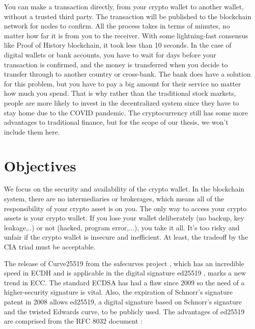 You can make a transaction directly, from your crypto wallet to another wallet, without a trusted third party. The transaction will be published to the blockchain network for nodes to confirm. All the process takes in terms of minutes, no matter how far it is from you to the receiver. With some lightning-fast consensus like Proof of History blockchain, it took less than 10 seconds. In the case of digital wallets or bank accounts, you have to wait for days before your transaction is confirmed, and the money is transferred when you decide to transfer through to another country or cross-bank. The bank does have a solution for this problem, but you have to pay a big amount for their service no matter how much you spend. That is why rather than the traditional stock markets, people are more likely to invest in the decentralized system since they have to stay home due to the COVID pandemic. The cryptocurrency still has some more advantages to traditional finance, but for the scope of our thesis, we won’t include them here.

\section{Objectives}

We focus on the security and availability of the crypto wallet. In the blockchain system, there are no intermediaries or brokerages, which means all of the responsibility of your crypto asset is on you. The only way to access your crypto assets is your crypto wallet. If you lose your wallet deliberately (no backup, key leakage,..) or not (hacked, program error,...), you take it all. It’s too risky and unfair if the crypto wallet is insecure and inefficient. At least, the tradeoff by the CIA triad must be acceptable.

The release of Curve25519 from the safecurves project \cite{Bernstein2006}, which has an incredible speed in ECDH and is applicable in the digital signature ed25519 \cite{Bernstein2011}, marks a new trend in ECC. The standard ECDSA has had a flaw since 2009 \cite{Schmidt2009} so the need of a higher-security signature is vital. Also, the expiration of Schnorr’s signature patent in 2008 allows ed25519, a digital signature based on Schnorr’s signature and the twisted Edwards curve, to be publicly used. The advantages of ed25519 are comprised from the RFC 8032 document \cite{Josefsson2017}:

